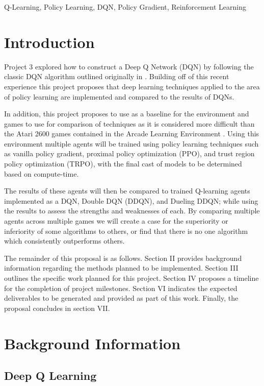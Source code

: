 \documentclass[conference]{IEEEtran}
\begin{document}
\begin{IEEEkeywords}
Q-Learning, Policy Learning, DQN, Policy Gradient, Reinforcement Learning
\end{IEEEkeywords}

\section{Introduction}
Project 3 explored how to construct a Deep Q Network (DQN) by following the classic DQN algorithm outlined originally in \cite{DQNOriginalPaper}.
Building off of this recent experience this project proposes that deep learning techniques applied to the area of policy learning are implemented and compared to the results of DQNs.

In addition, this project proposes to use \cite{bhonker2017playing} as a baseline for the environment and games to use for comparison of techniques as it is considered more difficult than the Atari 2600 games contained in the Arcade Learning Environment \cite{Bellemare_2013}.
Using this environment multiple agents will be trained using policy learning techniques such as vanilla policy gradient, proximal policy optimization (PPO), and trust region policy optimization (TRPO), with the final cast of models to be determined based on compute-time.

The results of these agents will then be compared to trained Q-learning agents implemented as a DQN, Double DQN (DDQN), and Dueling DDQN; while using the results to assess the strengths and weaknesses of each. By comparing multiple agents across multiple games we will create a case for the superiority or inferiority of some algorithms to others, or find that there is no one algorithm which consistently outperforms others.

The remainder of this proposal is as follows.
Section II provides background information regarding the methods planned to be implemented.
Section III outlines the specific work planned for this project.
Section IV proposes a timeline for the completion of project milestones.
Section VI indicates the expected deliverables to be generated and provided as part of this work.
Finally, the proposal concludes in section VII.

\section{Background Information}

\subsection{Deep Q Learning}
\end{document}
